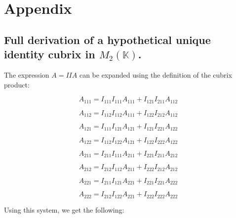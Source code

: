 
\appendix
\section{Appendix} \label{appendix}

\subsection{Full derivation of a hypothetical unique identity cubrix in $M_2 (\mathbb{K})$.} \label{appendix-1}

The expression $A = IIA$ can be expanded using the definition of the cubrix product:

\begin{equation}
A_{111} = I_{111} I_{111} A_{111} + I_{121} I_{211} A_{112}
\end{equation}

\begin{equation}
A_{112} = I_{112} I_{112} A_{111} + I_{122} I_{212} A_{112}
\end{equation}

\begin{equation}
A_{121} = I_{111} I_{121} A_{121} + I_{121} I_{221} A_{122}
\end{equation}

\begin{equation}
A_{122} = I_{112} I_{122} A_{121} + I_{122} I_{222} A_{122}
\end{equation}

\begin{equation}
A_{211} = I_{211} I_{111} A_{211} + I_{221} I_{211} A_{212}
\end{equation}

\begin{equation}
A_{212} = I_{212} I_{112} A_{211} + I_{222} I_{212} A_{212}
\end{equation}

\begin{equation}
A_{221} = I_{211} I_{121} A_{221} + I_{221} I_{221} A_{222}
\end{equation}

\begin{equation}
A_{222} = I_{212} I_{122} A_{221} + I_{222} I_{222} A_{222}
\end{equation}

Using this system, we get the following:

